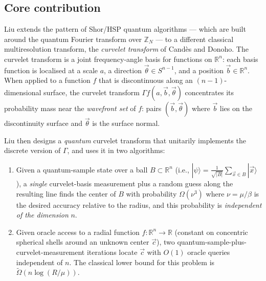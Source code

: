 \documentclass[11pt]{article}
\begin{document}
\subsection{Core contribution}
Liu extends the pattern of Shor/HSP quantum algorithms --- which are built around the quantum Fourier transform over $\mathbb{Z}_N$ --- to a different classical multiresolution transform, the \emph{curvelet transform} of Cand\`es and Donoho. The curvelet transform is a joint frequency-angle basis for functions on $\mathbb{R}^n$: each basis function is localised at a scale $a$, a direction $\vec\theta \in S^{n-1}$, and a position $\vec b \in \mathbb{R}^n$. When applied to a function $f$ that is discontinuous along an $(n-1)$-dimensional surface, the curvelet transform $\Gamma f(a, \vec b, \vec\theta)$ concentrates its probability mass near the \emph{wavefront set} of $f$: pairs $(\vec b, \vec\theta)$ where $\vec b$ lies on the discontinuity surface and $\vec\theta$ is the surface normal.

Liu then designs a \emph{quantum} curvelet transform that unitarily implements the discrete version of $\Gamma$, and uses it in two algorithms:
\begin{enumerate}
  \item[Alg.~1] Given a quantum-sample state over a ball $B \subset \mathbb{R}^n$ (i.e., $|\psi\rangle = \frac{1}{\sqrt{|B|}} \sum_{\vec x \in B} |\vec x\rangle$), a \emph{single} curvelet-basis measurement plus a random guess along the resulting line finds the center of $B$ with probability $\Omega(\nu^3)$ where $\nu = \mu / \beta$ is the desired accuracy relative to the radius, and this probability is \emph{independent of the dimension} $n$.
  \item[Alg.~2] Given oracle access to a radial function $f: \mathbb{R}^n \to \mathbb{R}$ (constant on concentric spherical shells around an unknown center $\vec c$), two quantum-sample-plus-curvelet-measurement iterations locate $\vec c$ with $O(1)$ oracle queries independent of $n$. The classical lower bound for this problem is $\tilde\Omega(n \log(R/\mu))$.
\end{enumerate}
\end{document}
